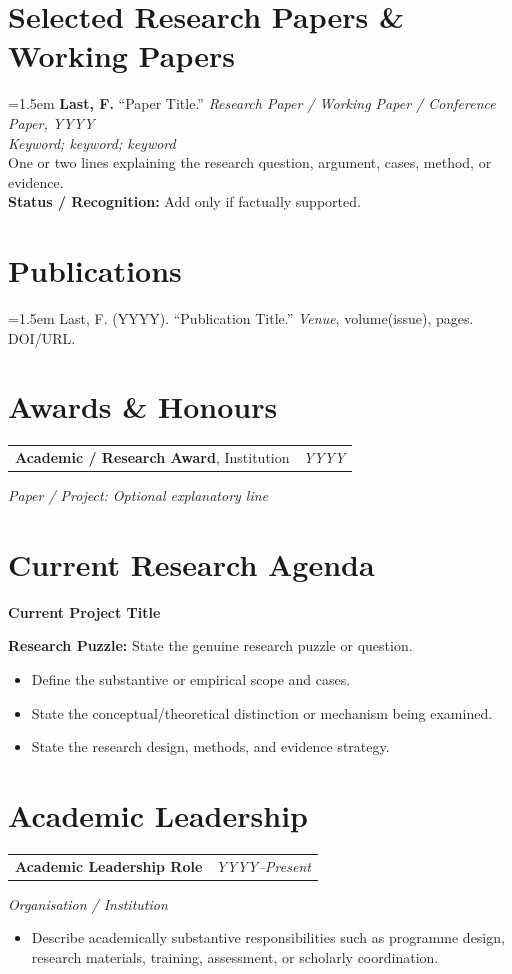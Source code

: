 \documentclass[10pt,a4paper]{article}
\makeatletter
\newcommand{\datedline}[2]{%
  \begin{tabularx}{\textwidth}{@{}Xr@{}}
    #1 & \textit{#2}
  \end{tabularx}%
}
\newcommand{\roleentry}[3]{%
  \datedline{{\fontsize{10.3pt}{11.2pt}\selectfont\textbf{#1}}}{#3}\vspace{1.25pt}
  \textit{#2}\par\vspace{1.25pt}
}
\newcommand{\puzzleline}[1]{%
  \textbf{Research Puzzle:} #1\par\vspace{1.8pt}
}
\newcommand{\paperentry}[1]{%
  \hangindent=1.5em\hangafter=1 #1\par
}
\makeatother
\begin{document}
\section{Selected Research Papers \& Working Papers}
\paperentry{
\textbf{Last, F.} ``Paper Title.''
\hfill \textit{Research Paper / Working Paper / Conference Paper, YYYY}\\[-1pt]
\textit{Keyword; keyword; keyword}\\[1.5pt]
\small
One or two lines explaining the research question, argument, cases, method, or evidence.\\[1.5pt]
\textbf{Status / Recognition:} Add only if factually supported.
}

\section{Publications}
\paperentry{Last, F. (YYYY). ``Publication Title.'' \textit{Venue}, volume(issue), pages. DOI/URL.}

\section{Awards \& Honours}
\datedline{\textbf{Academic / Research Award}, Institution}{YYYY}
\textit{Paper / Project: Optional explanatory line}\par

\section{Current Research Agenda}
\textbf{Current Project Title}\par\vspace{1.5pt}
\puzzleline{State the genuine research puzzle or question.}
\begin{itemize}
    \item Define the substantive or empirical scope and cases.
    \item State the conceptual/theoretical distinction or mechanism being examined.
    \item State the research design, methods, and evidence strategy.
\end{itemize}

\section{Academic Leadership}
\roleentry{Academic Leadership Role}{Organisation / Institution}{YYYY--Present}
\begin{itemize}
  \item Describe academically substantive responsibilities such as programme design, research materials, training, assessment, or scholarly coordination.
\end{itemize}
\end{document}
